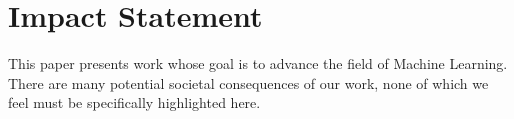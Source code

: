 \documentclass{article}
\theoremstyle{plain}
\theoremstyle{definition}
\theoremstyle{remark}
\newcommand{\ours}{{\sc NeSyS}\xspace}
\begin{document}

\section*{Impact Statement}
This paper presents work whose goal is to advance the field of Machine
Learning. There are many potential societal consequences of our work, none of which we feel must be specifically highlighted here.




\newpage
\appendix
\onecolumn
\end{document}
